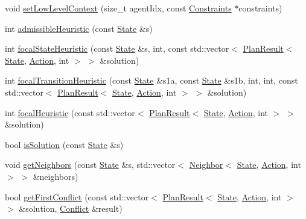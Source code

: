 \begin{DoxyCompactItemize}
\item 
void \hyperlink{class_environment_a56b6dff6d3af3fe6404936a14a259c56}{set\+Low\+Level\+Context} (size\+\_\+t agent\+Idx, const \hyperlink{struct_constraints}{Constraints} $\ast$constraints)
\item 
int \hyperlink{class_environment_a171e702c373005a9d6e77b79daa365d9}{admissible\+Heuristic} (const \hyperlink{struct_state}{State} \&s)
\item 
int \hyperlink{class_environment_ae9c3ec27de36238b2d0ea75b8e2e80b1}{focal\+State\+Heuristic} (const \hyperlink{struct_state}{State} \&s, int, const std\+::vector$<$ \hyperlink{structlib_multi_robot_planning_1_1_plan_result}{Plan\+Result}$<$ \hyperlink{struct_state}{State}, \hyperlink{a__star_8cpp_a8bb1ef53467e4f61410d12822d922498}{Action}, int $>$ $>$ \&solution)
\item 
int \hyperlink{class_environment_a32ad1d8cf07f2104e033065fb95fadf6}{focal\+Transition\+Heuristic} (const \hyperlink{struct_state}{State} \&s1a, const \hyperlink{struct_state}{State} \&s1b, int, int, const std\+::vector$<$ \hyperlink{structlib_multi_robot_planning_1_1_plan_result}{Plan\+Result}$<$ \hyperlink{struct_state}{State}, \hyperlink{a__star_8cpp_a8bb1ef53467e4f61410d12822d922498}{Action}, int $>$ $>$ \&solution)
\item 
int \hyperlink{class_environment_a54d9038dd600b904b73936273d711fd0}{focal\+Heuristic} (const std\+::vector$<$ \hyperlink{structlib_multi_robot_planning_1_1_plan_result}{Plan\+Result}$<$ \hyperlink{struct_state}{State}, \hyperlink{a__star_8cpp_a8bb1ef53467e4f61410d12822d922498}{Action}, int $>$ $>$ \&solution)
\item 
bool \hyperlink{class_environment_aab14c04c6aaaf6b0d0f26f8b92d44400}{is\+Solution} (const \hyperlink{struct_state}{State} \&s)
\item 
void \hyperlink{class_environment_a4ae69480c6b9e716f282839dc4f323c0}{get\+Neighbors} (const \hyperlink{struct_state}{State} \&s, std\+::vector$<$ \hyperlink{structlib_multi_robot_planning_1_1_neighbor}{Neighbor}$<$ \hyperlink{struct_state}{State}, \hyperlink{a__star_8cpp_a8bb1ef53467e4f61410d12822d922498}{Action}, int $>$ $>$ \&neighbors)
\item 
bool \hyperlink{class_environment_a666d55a1f0bbc038d3662b75f400faa4}{get\+First\+Conflict} (const std\+::vector$<$ \hyperlink{structlib_multi_robot_planning_1_1_plan_result}{Plan\+Result}$<$ \hyperlink{struct_state}{State}, \hyperlink{a__star_8cpp_a8bb1ef53467e4f61410d12822d922498}{Action}, int $>$ $>$ \&solution, \hyperlink{struct_conflict}{Conflict} \&result)

\end{DoxyCompactItemize}
